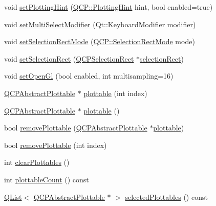 \begin{DoxyCompactItemize}
\item 
void \hyperlink{class_q_custom_plot_a3b7c97bb6c16464e9e15190c07abe9a9}{set\+Plotting\+Hint} (\hyperlink{namespace_q_c_p_a5400e5fcb9528d92002ddb938c1f4ef4}{Q\+C\+P\+::\+Plotting\+Hint} hint, bool enabled=true)
\item 
void \hyperlink{class_q_custom_plot_a8fc96e3b5138a06759a2a90c166df516}{set\+Multi\+Select\+Modifier} (Qt\+::\+Keyboard\+Modifier modifier)
\item 
void \hyperlink{class_q_custom_plot_a810ef958ebe84db661c7288b526c0deb}{set\+Selection\+Rect\+Mode} (\hyperlink{namespace_q_c_p_ac9aa4d6d81ac76b094f9af9ad2d3aacf}{Q\+C\+P\+::\+Selection\+Rect\+Mode} mode)
\item 
void \hyperlink{class_q_custom_plot_a0c09f96df15faa4799ad7051bb16cf33}{set\+Selection\+Rect} (\hyperlink{class_q_c_p_selection_rect}{Q\+C\+P\+Selection\+Rect} $\ast$\hyperlink{class_q_custom_plot_ad7df2bcbba307e644db383b449e31efd}{selection\+Rect})
\item 
void \hyperlink{class_q_custom_plot_a7db1adc09016329f3aef7c60da935789}{set\+Open\+Gl} (bool enabled, int multisampling=16)
\item 
\hyperlink{class_q_c_p_abstract_plottable}{Q\+C\+P\+Abstract\+Plottable} $\ast$ \hyperlink{class_q_custom_plot_a32de81ff53e263e785b83b52ecd99d6f}{plottable} (int index)
\item 
\hyperlink{class_q_c_p_abstract_plottable}{Q\+C\+P\+Abstract\+Plottable} $\ast$ \hyperlink{class_q_custom_plot_adea38bdc660da9412ba69fb939031567}{plottable} ()
\item 
bool \hyperlink{class_q_custom_plot_af3dafd56884208474f311d6226513ab2}{remove\+Plottable} (\hyperlink{class_q_c_p_abstract_plottable}{Q\+C\+P\+Abstract\+Plottable} $\ast$\hyperlink{class_q_custom_plot_a32de81ff53e263e785b83b52ecd99d6f}{plottable})
\item 
bool \hyperlink{class_q_custom_plot_afc210e0021480f8119bccf37839dbcc8}{remove\+Plottable} (int index)
\item 
int \hyperlink{class_q_custom_plot_a9a409bb3201878adb7ffba1c89c4e004}{clear\+Plottables} ()
\item 
int \hyperlink{class_q_custom_plot_a5f4f15991c14bf9ad659bb2a19dfbed4}{plottable\+Count} () const
\item 
\hyperlink{class_q_list}{Q\+List}$<$ \hyperlink{class_q_c_p_abstract_plottable}{Q\+C\+P\+Abstract\+Plottable} $\ast$ $>$ \hyperlink{class_q_custom_plot_a747faaab57c56891e901a1e97fa4359a}{selected\+Plottables} () const
\item 

\end{DoxyCompactItemize}
